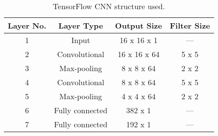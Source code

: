 \begin{table}
\centering \caption{TensorFlow CNN structure used.} \label{tab:layers}
 \normalsize
     \begin{tabular}{c c c c}
         \hline
         Layer No. & Layer Type      & Output Size & Filter Size \\ \hline
         1         & Input           & 16 x 16 x 1 &  ---\\
         2         & Convolutional   & 16 x 16 x 64 & 5 x 5 \\
         3         & Max-pooling     & 8 x 8 x 64 & 2 x 2 \\
         4         & Convolutional   & 8 x 8 x 64 &  5 x 5 \\
         5         & Max-pooling     & 4 x 4 x 64 &  2 x 2 \\
         6         & Fully connected & 382 x 1 & --- \\
         7         & Fully connected & 192 x 1 & --- \\
         \hline
     \end{tabular}
 \end{table}
